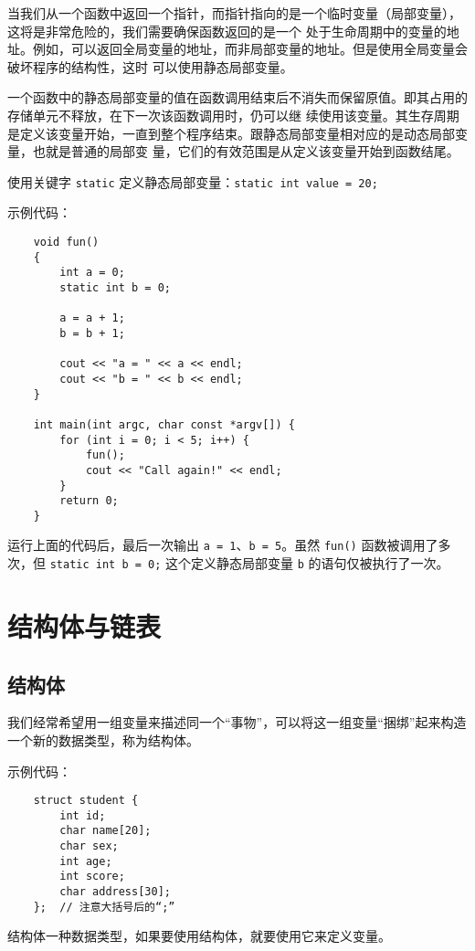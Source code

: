 \documentclass[UTF8]{ctexart}
\begin{document}
当我们从一个函数中返回一个指针，而指针指向的是一个临时变量（局部变量），这将是非常危险的，我们需要确保函数返回的是一个
处于生命周期中的变量的地址。例如，可以返回全局变量的地址，而非局部变量的地址。但是使用全局变量会破坏程序的结构性，这时
可以使用静态局部变量。

一个函数中的静态局部变量的值在函数调用结束后不消失而保留原值。即其占用的存储单元不释放，在下一次该函数调用时，仍可以继
续使用该变量。其生存周期是定义该变量开始，一直到整个程序结束。跟静态局部变量相对应的是动态局部变量，也就是普通的局部变
量，它们的有效范围是从定义该变量开始到函数结尾。

使用关键字 \texttt{static} 定义静态局部变量：\texttt{static int value = 20;}

示例代码：
\begin{verbatim}
    void fun()
    {
        int a = 0;
        static int b = 0;

        a = a + 1;
        b = b + 1;

        cout << "a = " << a << endl;
        cout << "b = " << b << endl;
    }

    int main(int argc, char const *argv[]) {
        for (int i = 0; i < 5; i++) {
            fun();
            cout << "Call again!" << endl;
        }
        return 0;
    }
\end{verbatim}

运行上面的代码后，最后一次输出 \texttt{a = 1}、\texttt{b = 5}。虽然 \texttt{fun()} 函数被调用了多次，但
\texttt{static int b = 0;} 这个定义静态局部变量 \texttt{b} 的语句仅被执行了一次。

\section{结构体与链表}
\subsection{结构体}
我们经常希望用一组变量来描述同一个“事物”，可以将这一组变量“捆绑”起来构造一个新的数据类型，称为结构体。

示例代码：
\begin{verbatim}
    struct student {
        int id;
        char name[20];
        char sex;
        int age;
        int score;
        char address[30];
    };  // 注意大括号后的“;”
\end{verbatim}

结构体一种数据类型，如果要使用结构体，就要使用它来定义变量。
\end{document}
